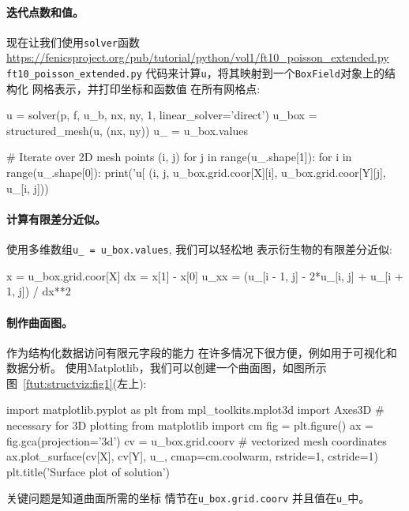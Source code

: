 \noindent
\paragraph{迭代点数和值。}
现在让我们使用\texttt{solver}函数
\url{https://fenicsproject.org/pub/tutorial/python/vol1/ft10_poisson_extended.py} {\nolinkurl{ft10_poisson_extended.py}}
代码来计算\texttt{u}，将其映射到一个\texttt{BoxField}对象上的结构化
网格表示，并打印坐标和函数值
在所有网格点:

\begin{python}
u = solver(p, f, u_b, nx, ny, 1, linear_solver='direct')
u_box = structured_mesh(u, (nx, ny))
u_ = u_box.values

# Iterate over 2D mesh points (i, j)
for j in range(u_.shape[1]):
    for i in range(u_.shape[0]):
        print('u[%
              (i, j,
               u_box.grid.coor[X][i], u_box.grid.coor[Y][j],
               u_[i, j]))
\end{python}

\paragraph{计算有限差分近似。}
使用多维数组\verb!u_ = u_box.values!, 我们可以轻松地
表示衍生物的有限差分近似:

\begin{python}
x = u_box.grid.coor[X]
dx = x[1] - x[0]
u_xx = (u_[i - 1, j] - 2*u_[i, j] + u_[i + 1, j]) / dx**2
\end{python}


\paragraph{制作曲面图。}
作为结构化数据访问有限元字段的能力
在许多情况下很方便，例如用于可视化和数据分析。
使用Matplotlib，我们可以创建一个曲面图，如图所示
图~\ref{ftut:structviz:fig1}(左上):

\begin{python}
import matplotlib.pyplot as plt
from mpl_toolkits.mplot3d import Axes3D  # necessary for 3D plotting
from matplotlib import cm
fig = plt.figure()
ax = fig.gca(projection='3d')
cv = u_box.grid.coorv  # vectorized mesh coordinates
ax.plot_surface(cv[X], cv[Y], u_, cmap=cm.coolwarm,
                rstride=1, cstride=1)
plt.title('Surface plot of solution')
\end{python}
关键问题是知道曲面所需的坐标
情节在\verb!u_box.grid.coorv! 并且值在\verb!u_!中。

